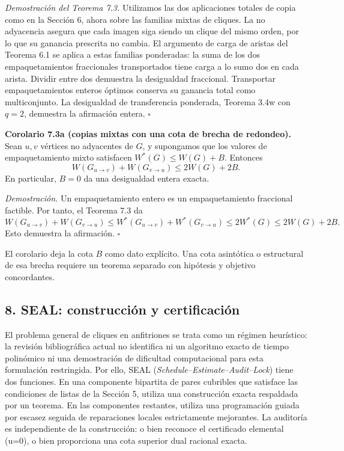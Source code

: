 \documentclass[spanish,11pt,a4paper]{article}
\begin{document}
\emph{Demostración del Teorema 7.3.} Utilizamos las dos aplicaciones
totales de copia como en la Sección 6, ahora sobre las familias mixtas
de cliques. La no adyacencia asegura que cada imagen siga siendo un
clique del mismo orden, por lo que su ganancia prescrita no cambia. El
argumento de carga de aristas del Teorema 6.1 se aplica a estas familias
ponderadas: la suma de los dos empaquetamientos fraccionales
transportados tiene carga a lo sumo dos en cada arista. Dividir entre
dos demuestra la desigualdad fraccional. Transportar empaquetamientos
enteros óptimos conserva su ganancia total como multiconjunto. La
desigualdad de transferencia ponderada, Teorema 3.4w con \(q=2\),
demuestra la afirmación entera. \(\square\)

\textbf{Corolario 7.3a (copias mixtas con una cota de brecha de
redondeo).} Sean \(u,v\) vértices no adyacentes de \(G\), y supongamos
que los valores de empaquetamiento mixto satisfacen
\(W^*(G)\le W(G)+B\). Entonces \[
W(G_{u\to v})+W(G_{v\to u})\le2W(G)+2B.
\] En particular, \(B=0\) da una desigualdad entera exacta.

\emph{Demostración.} Un empaquetamiento entero es un empaquetamiento
fraccional factible. Por tanto, el Teorema 7.3 da \[
W(G_{u\to v})+W(G_{v\to u})
\le W^*(G_{u\to v})+W^*(G_{v\to u})
\le2W^*(G)\le2W(G)+2B.
\] Esto demuestra la afirmación. \(\square\)

El corolario deja la cota \(B\) como dato explícito. Una cota asintótica
o estructural de esa brecha requiere un teorema separado con hipótesis y
objetivo concordantes.

\subsection{8. SEAL: construcción y
certificación}\label{seal-construcciuxf3n-y-certificaciuxf3n}

El problema general de cliques en anfitriones se trata como un régimen
heurístico: la revisión bibliográfica actual no identifica ni un
algoritmo exacto de tiempo polinómico ni una demostración de dificultad
computacional para esta formulación restringida. Por ello, SEAL
(\emph{Schedule--Estimate--Audit--Lock}) tiene dos funciones. En una
componente bipartita de pares cubribles que satisface las condiciones de
listas de la Sección 5, utiliza una construcción exacta respaldada por
un teorema. En las componentes restantes, utiliza una programación
guiada por escasez seguida de reparaciones locales estrictamente
mejorantes. La auditoría es independiente de la construcción: o bien
reconoce el certificado elemental (u=0), o bien proporciona una cota
superior dual racional exacta.
\end{document}
